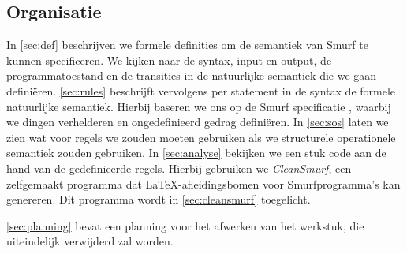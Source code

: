 \subsection{Organisatie} %

In \autoref{sec:def} beschrijven we formele definities om de semantiek van
Smurf te kunnen specificeren. We kijken naar de syntax, input en output, de
programmatoestand en de transities in de natuurlijke semantiek die we gaan
definiëren. \autoref{sec:rules} beschrijft vervolgens per statement in de
syntax de formele natuurlijke semantiek. Hierbij baseren we ons op de Smurf
specificatie \cite{safalra}, waarbij we dingen verhelderen en ongedefinieerd
gedrag definiëren. In \autoref{sec:sos} laten we zien wat voor regels we zouden
moeten gebruiken als we structurele operationele semantiek zouden gebruiken. In
\autoref{sec:analyse} bekijken we een stuk code aan de hand van de
gedefinieerde regels. Hierbij gebruiken we \emph{CleanSmurf}, een zelfgemaakt
programma dat \LaTeX-afleidingsbomen voor Smurfprogramma's kan genereren. Dit
programma wordt in \autoref{sec:cleansmurf} toegelicht.

\autoref{sec:planning} bevat een planning voor het afwerken van het werkstuk,
die uiteindelijk verwijderd zal worden.
